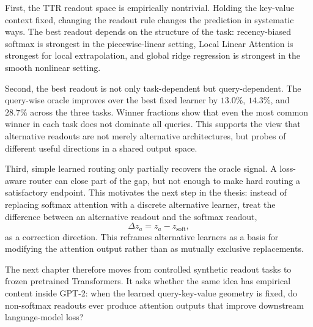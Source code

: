 First, the TTR readout space is empirically nontrivial. Holding the key-value context fixed, changing the readout rule changes the prediction in systematic ways. The best readout depends on the structure of the task: recency-biased softmax is strongest in the piecewise-linear setting, Local Linear Attention is strongest for local extrapolation, and global ridge regression is strongest in the smooth nonlinear setting.

Second, the best readout is not only task-dependent but query-dependent. The query-wise oracle improves over the best fixed learner by \(13.0\%\), \(14.3\%\), and \(28.7\%\) across the three tasks. Winner fractions show that even the most common winner in each task does not dominate all queries. This supports the view that alternative readouts are not merely alternative architectures, but probes of different useful directions in a shared output space.

Third, simple learned routing only partially recovers the oracle signal. A loss-aware router can close part of the gap, but not enough to make hard routing a satisfactory endpoint. This motivates the next step in the thesis: instead of replacing softmax attention with a discrete alternative learner, treat the difference between an alternative readout and the softmax readout,
\[
\Delta z_a = z_a - z_{\mathrm{soft}},
\]
as a correction direction. This reframes alternative learners as a basis for modifying the attention output rather than as mutually exclusive replacements.

The next chapter therefore moves from controlled synthetic readout tasks to frozen pretrained Transformers. It asks whether the same idea has empirical content inside GPT-2: when the learned query-key-value geometry is fixed, do non-softmax readouts ever produce attention outputs that improve downstream language-model loss?
